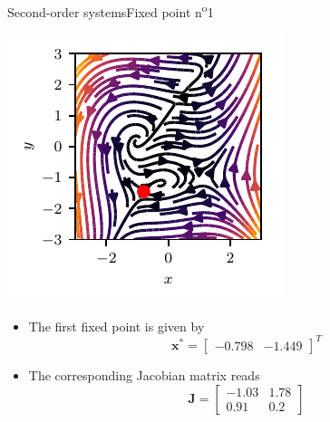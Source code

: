 \documentclass[usenames,dvipsnames,svgnames,10pt,aspectratio=169]{beamer}
\begin{document}
\begin{frame}[t, c]{Second-order systems}{Fixed point n\textsuperscript{o}1}
		\begin{minipage}{.48\textwidth}
			\centering
			\includegraphics[width=.75\textwidth]{fixed_points_1}
		\end{minipage}%
		\hfill
		\begin{minipage}{.48\textwidth}
			\begin{itemize}
				\item The first fixed point is given by
				$${\bm x}^* = \begin{bmatrix} -0.798 & -1.449 \end{bmatrix}^T$$

				\bigskip

				\item The corresponding Jacobian matrix reads
				$${\bm J} = \begin{bmatrix} -1.03 & 1.78 \\ 0.91 & 0.2 \end{bmatrix}$$
			\end{itemize}
		\end{minipage}

		\vspace{1cm}
\end{frame}
\end{document}
